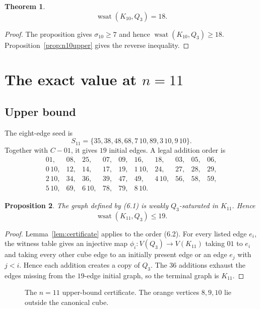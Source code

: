 \documentclass[11pt]{article}
\numberwithin{equation}{section}
\newtheorem{theorem}{Theorem}[section]
\newtheorem{proposition}[theorem]{Proposition}
\newcommand{\wsat}{\operatorname{wsat}}
\begin{document}
\begin{theorem}\label{thm:n10}
\[
\boxed{\wsat(K_{10},Q_3)=18.}
\]
\end{theorem}

\begin{proof}
The proposition gives $\sigma_{10}\ge7$ and hence $\wsat(K_{10},Q_3)\ge18$. Proposition~\ref{prop:n10upper} gives the reverse inequality.
\end{proof}

\section{\texorpdfstring{The exact value at $n=11$}{The exact value at n=11}}\label{sec:n11}

\subsection{Upper bound}
The eight-edge seed is
\[
S_{11}=\{35,38,48,68,7\,10,89,3\,10,9\,10\}.
\tag{6.1}
\]
Together with $C-01$, it gives $19$ initial edges. A legal addition order is
\[
\begin{array}{cccccccccc}
01,&08,&25,&07,&09,&16,&18,&03,&05,&06,\\
0\,10,&12,&14,&17,&19,&1\,10,&24,&27,&28,&29,\\
2\,10,&34,&36,&39,&47,&49,&4\,10,&56,&58,&59,\\
5\,10,&69,&6\,10,&78,&79,&8\,10.
\end{array}
\tag{6.2}
\]

\begin{proposition}\label{prop:n11upper}
The graph defined by (6.1) is weakly $Q_3$-saturated in $K_{11}$. Hence
\[
\wsat(K_{11},Q_3)\le19.
\]
\end{proposition}

\begin{proof}
Lemma~\ref{lem:certificate} applies to the order (6.2). For every listed edge $e_i$, the witness table gives an injective map $\phi_i:V(Q_3)\to V(K_{11})$ taking $01$ to $e_i$ and taking every other cube edge to an initially present edge or an edge $e_j$ with $j<i$. Hence each addition creates a copy of $Q_3$. The $36$ additions exhaust the edges missing from the $19$-edge initial graph, so the terminal graph is $K_{11}$.
\end{proof}

\begin{figure}[t]
\centering
\resizebox{0.72\linewidth}{!}{}
\caption{The $n=11$ upper-bound certificate. The orange vertices $8,9,10$ lie outside the canonical cube.}
\label{fig:n11seed}
\end{figure}
\end{document}
